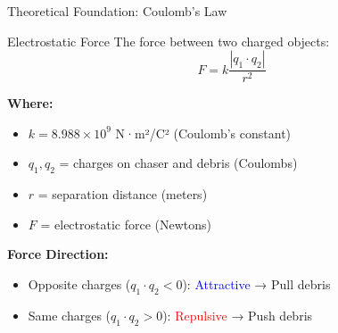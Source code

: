 \documentclass[aspectratio=169]{beamer}
\begin{document}
\begin{frame}{Theoretical Foundation: Coulomb's Law}
\begin{block}{Electrostatic Force}
The force between two charged objects:
\begin{equation}
F = k \frac{|q_1 \cdot q_2|}{r^2}
\end{equation}
\end{block}

\textbf{Where:}
\begin{itemize}
    \item $k = 8.988 \times 10^9$ N·m²/C² (Coulomb's constant)
    \item $q_1, q_2$ = charges on chaser and debris (Coulombs)
    \item $r$ = separation distance (meters)
    \item $F$ = electrostatic force (Newtons)
\end{itemize}

\vspace{1em}
\textbf{Force Direction:}
\begin{itemize}
    \item Opposite charges ($q_1 \cdot q_2 < 0$): \textcolor{blue}{Attractive} → Pull debris
    \item Same charges ($q_1 \cdot q_2 > 0$): \textcolor{red}{Repulsive} → Push debris
\end{itemize}
\end{frame}
\end{document}

